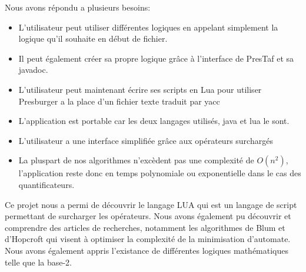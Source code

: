 \documentclass[12pt]{article}%
\begin{document}
Nous avons répondu a plusieurs besoins:
	\begin{itemize}
\item L'utilisateur peut utiliser différentes logiques en appelant simplement la logique qu'il souhaite en début de fichier.
\item Il peut également créer sa propre logique grâce à l'interface de PresTaf et sa javadoc.
\item L'utilisateur peut maintenant écrire ses scripts en Lua pour utiliser Presburger a la place d'un fichier texte traduit par yacc
\item L'application est portable car les deux langages utilisés, java et lua le sont.
\item L'utilisateur a une interface simplifiée grâce aux opérateurs surchargés
\item La pluspart de nos algorithmes n'excèdent pas une complexité de $O(n^2)$, l'application reste donc en temps polynomiale ou exponentielle dans le cas des quantificateurs.
\end{itemize}

Ce projet nous a permi de découvrir le langage LUA qui est un langage de script permettant de surcharger les opérateurs. Nous avons également pu découvrir et comprendre des articles de recherches, notamment les algorithmes de Blum et d'Hopcroft qui visent à optimiser la complexité de la minimisation d'automate. Nous avons également appris l'existance de différentes logiques mathématiques telle que la base-2.


\appendix





%


%
\clearpage
\printglossaries
\clearpage
{}

\end{document}
